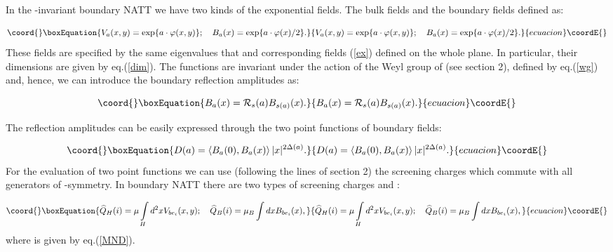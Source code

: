 \documentclass[a4paper,12pt]{article}
\begin{document}
In the \coordHE{}-invariant boundary NATT we have 
two kinds of the exponential fields. The
bulk fields \coordHE{} and the boundary fields \coordHE{} defined as:

\begin{equation}\coord{}\boxEquation{
V_a(x,y)=\exp \{a\cdot \varphi (x,y)\};\quad B_a(x)=\exp \{a\cdot \varphi
(x)/2\}.  \label{VA}
}{
V_a(x,y)=\exp \{a\cdot \varphi (x,y)\};\quad B_a(x)=\exp \{a\cdot \varphi
(x)/2\}.  }{ecuacion}\coordE{}\end{equation}
These fields are specified by the same \coordHE{} eigenvalues \coordHE{} that and
corresponding fields (\ref{ex}) defined on the whole plane. In particular,
their dimensions are given by eq.(\ref{dim}). The functions \coordHE{} are
invariant under the action of the Weyl group of \coordHE{} (see section 2), defined
by eq.(\ref{wg}) and, hence, we can introduce the boundary reflection
amplitudes \coordHE{} as:

\begin{equation}\coord{}\boxEquation{
B_a(x)={\cal R}_s(a)B_{s(a)}(x).  \label{R}
}{
B_a(x)={\cal R}_s(a)B_{s(a)}(x).  }{ecuacion}\coordE{}\end{equation}

The reflection amplitudes can be easily expressed through the two point
functions of boundary fields:

\begin{equation}\coord{}\boxEquation{
D(a)=\left\langle B_a(0),B_a(x)\right\rangle |x|^{2\Delta (a)}.  \label{D}
}{
D(a)=\left\langle B_a(0),B_a(x)\right\rangle |x|^{2\Delta (a)}.  }{ecuacion}\coordE{}\end{equation}
For the evaluation of two point functions we can use (following the lines of
section 2) the screening charges which commute with all generators of \coordHE{}
-symmetry. In boundary NATT there are two types of screening charges 
\coordHE{} and \coordHE{}:

\begin{equation}\coord{}\boxEquation{
\widehat{Q}_H(i)=\mu \int\limits_Hd^2xV_{be_i}(x,y);\quad \widehat{Q}
_B(i)=\mu _B\int dxB_{be_i}(x),  \label{S}
}{
\widehat{Q}_H(i)=\mu \int\limits_Hd^2xV_{be_i}(x,y);\quad \widehat{Q}
_B(i)=\mu _B\int dxB_{be_i}(x),  }{ecuacion}\coordE{}\end{equation}
where \coordHE{} is given by eq.(\ref{MND}).
\end{document}
